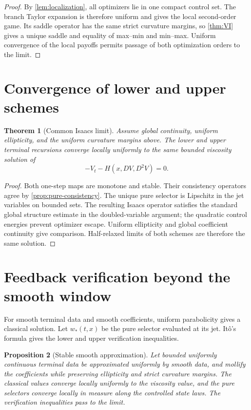 \documentclass[11pt,reqno]{amsart}
\newtheorem{theorem}{Theorem}[section]
\newtheorem{proposition}[theorem]{Proposition}
\theoremstyle{definition}
\begin{document}
\begin{proof}
By \cref{lem:localization}, all optimizers lie in one compact control set.
The branch Taylor expansion is therefore uniform and gives the local
second-order game.  Its saddle operator has the same strict curvature margins,
so \cref{thm:VI} gives a unique saddle and equality of max--min and min--max.
Uniform convergence of the local payoffs permits passage of both optimization
orders to the limit.
\end{proof}

\section{Convergence of lower and upper schemes}

\begin{theorem}[Common Isaacs limit]\label{thm:common-limit}
Assume global continuity, uniform ellipticity, and the uniform curvature
margins above.  The lower and upper terminal recursions converge locally
uniformly to the same bounded viscosity solution of
\[
 -V_t-H(x,DV,D^2V)=0.
\]
\end{theorem}

\begin{proof}
Both one-step maps are monotone and stable.  Their consistency operators agree
by \cref{prop:pure-consistency}.  The unique pure selector is Lipschitz in the
jet variables on bounded sets.  The resulting Isaacs operator satisfies the
standard global structure estimate in the doubled-variable argument; the
quadratic control energies prevent optimizer escape.  Uniform ellipticity and
global coefficient continuity give comparison.  Half-relaxed limits of both
schemes are therefore the same solution.
\end{proof}

\section{Feedback verification beyond the smooth window}

For smooth terminal data and smooth coefficients, uniform parabolicity gives a
classical solution.  Let $w_*(t,x)$ be the pure selector evaluated at its jet.
It\^o's formula gives the lower and upper verification inequalities.

\begin{proposition}[Stable smooth approximation]\label{prop:smooth-approx}
Let bounded uniformly continuous terminal data be approximated uniformly by
smooth data, and mollify the coefficients while preserving ellipticity and
strict curvature margins.  The classical values converge locally uniformly to
the viscosity value, and the pure selectors converge locally in measure along
the controlled state laws.  The verification inequalities pass to the limit.
\end{proposition}
\end{document}
